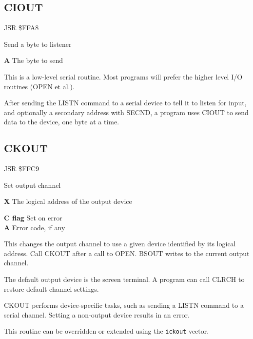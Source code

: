 
\newpage
\subsection{CIOUT}
\label{KERNAL Jump Table!CIOUT}
\begin{description}[leftmargin=2cm,style=nextline]
    \item [Address:] JSR \$FFA8
    \item [Description:] Send a byte to listener
    \item [Inputs:]
        \textbf{A} The byte to send
    \item [Remarks:]
        This is a low-level serial routine. Most programs will prefer the higher level I/O routines (OPEN et al.).

        After sending the LISTN command to a serial device to tell it to listen for input, and optionally a secondary address with SECND, a program uses CIOUT to send data to the device, one byte at a time.
    \item [Example:]
\end{description}



\newpage
\subsection{CKOUT}
\label{KERNAL Jump Table!CKOUT}
\begin{description}[leftmargin=2cm,style=nextline]
    \item [Address:] JSR \$FFC9
    \item [Description:] Set output channel
    \item [Inputs:]
        \textbf{X} The logical address of the output device
    \item [Outputs:]
        \textbf{C flag} Set on error \\
        \textbf{A} Error code, if any
    \item [Remarks:]
        This changes the output channel to use a given device identified by its logical address. Call CKOUT after a call to OPEN. BSOUT writes to the current output channel.

        The default output device is the screen terminal. A program can call CLRCH to restore default channel settings.

        CKOUT performs device-specific tasks, such as sending a LISTN command to a serial channel. Setting a non-output device results in an error.

        This routine can be overridden or extended using the \texttt{ickout} vector.
    \item [Example:]
\end{description}


